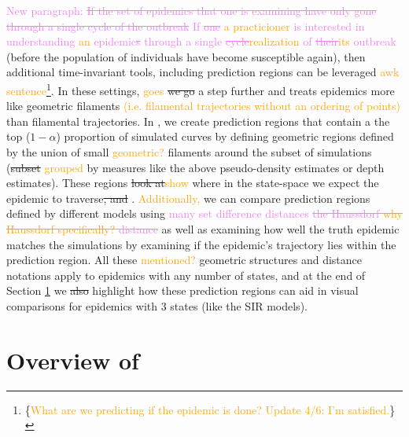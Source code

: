 \documentclass[
  shortnames]{jss}
\begin{document}
\textcolor{violet}{New paragraph:}
\textcolor{violet}{\sout{If the set of epidemics that one is examining have only gone through a single cycle of the outbreak} If \sout{one} \textcolor{orange}{a practicioner} is interested in understanding \textcolor{orange}{an} epidemic\sout{s} through a single \sout{cycle}\textcolor{orange}{realization} of \sout{their}\textcolor{orange}{its} outbreak}
(before the population of individuals have become susceptible again),
then additional time-invariant tools, including prediction regions can
be leveraged \textcolor{orange}{awk sentence}\footnote{\{\textcolor{orange}{What are we predicting if the epidemic is done? Update 4/6: I'm satisfied.}\}}.
In these settings, \textcolor{orange}{ goes}
\sout{we go }a step further and treats epidemics more like geometric
filaments
\textcolor{orange}{(i.e. filamental trajectories without an ordering of points)}
than filamental trajectories. In , we create prediction
regions that contain a the top (\(1-\alpha\)) proportion of simulated
curves by defining geometric regions defined by the union of small
\textcolor{orange}{geometric?} filaments around the subset of
simulations (\sout{subset} \textcolor{orange}{grouped} by measures like
the above pseudo-density estimates or depth estimates). These regions
\sout{look at}\textcolor{orange}{show} where in the state-space we
expect the epidemic to traverse\sout{, and }.
\textcolor{orange}{Additionally, }we can compare prediction regions
defined by different models using
\textcolor{violet}{many set difference distances \sout{the Haussdorf \textcolor{orange}{why Haussdorf specifically?} distance}}
as well as examining how well the truth epidemic matches the simulations
by examining if the epidemic's trajectory lies within the prediction
region. All these \textcolor{orange}{mentioned?} geometric structures
and distance notations apply to epidemics with any number of states, and
at the end of Section \ref{sec:overview} we \sout{also} highlight how
these prediction regions can aid in visual comparisons for epidemics
with 3 states (like the SIR models).

\section[Package overview]{Overview of
}\label{sec:overview}
\end{document}
